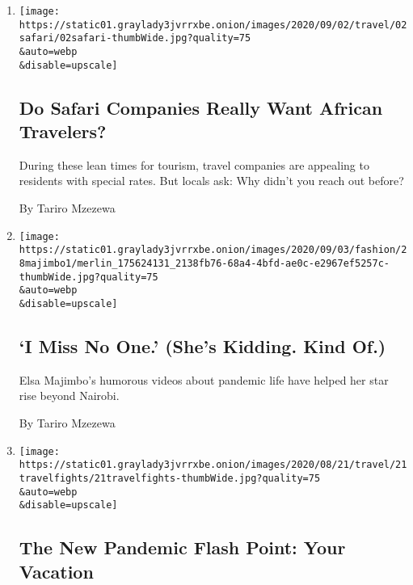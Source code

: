 \begin{enumerate}
\def\labelenumi{\arabic{enumi}.}
\item
  \href{/2020/09/02/travel/Africa-safaris-local-tourism-coronavirus.html}{}

  \texttt{[image: https://static01.graylady3jvrrxbe.onion/images/2020/09/02/travel/02safari/02safari-thumbWide.jpg?quality=75\\\&auto=webp\\\&disable=upscale]}

  \hypertarget{do-safari-companies-really-want-african-travelers}{%
  \subsection{Do Safari Companies Really Want African
  Travelers?}\label{do-safari-companies-really-want-african-travelers}}

  During these lean times for tourism, travel companies are appealing to
  residents with special rates. But locals ask: Why didn't you reach out
  before?

  By Tariro Mzezewa
\item
  \href{/2020/08/31/style/elsa-majimbo-nairobi-comedy.html}{}

  \texttt{[image: https://static01.graylady3jvrrxbe.onion/images/2020/09/03/fashion/28majimbo1/merlin\_175624131\_2138fb76-68a4-4bfd-ae0c-e2967ef5257c-thumbWide.jpg?quality=75\\\&auto=webp\\\&disable=upscale]}

  \hypertarget{i-miss-no-one-shes-kidding-kind-of}{%
  \subsection{`I Miss No One.' (She's Kidding. Kind
  Of.)}\label{i-miss-no-one-shes-kidding-kind-of}}

  Elsa Majimbo's humorous videos about pandemic life have helped her
  star rise beyond Nairobi.

  By Tariro Mzezewa
\item
  \href{/2020/08/25/travel/vacation-travel-coronavirus.html}{}

  \texttt{[image: https://static01.graylady3jvrrxbe.onion/images/2020/08/21/travel/21travelfights/21travelfights-thumbWide.jpg?quality=75\\\&auto=webp\\\&disable=upscale]}

  \hypertarget{the-new-pandemic-flash-point-your-vacation}{%
  \subsection{The New Pandemic Flash Point: Your
  Vacation}\label{the-new-pandemic-flash-point-your-vacation}}


\end{enumerate}
